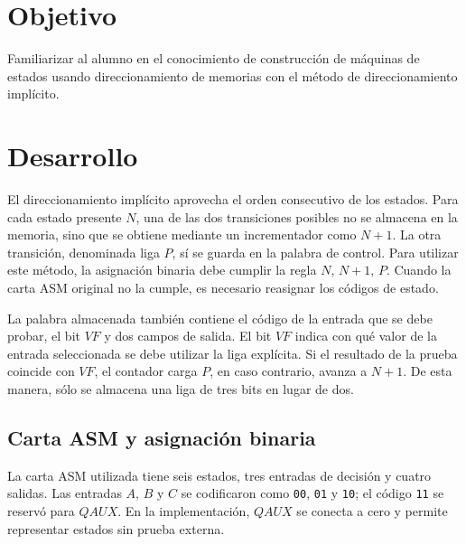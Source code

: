 \documentclass[letterpaper,12pt]{article}
\begin{document}

\newpage

\section{Objetivo}

Familiarizar al alumno en el conocimiento de construcción de máquinas de estados usando direccionamiento de memorias con el método de direccionamiento implícito.

\section{Desarrollo}

El direccionamiento implícito aprovecha el orden consecutivo de los estados. Para cada estado presente $N$, una de las dos transiciones posibles no se almacena en la memoria, sino que se obtiene mediante un incrementador como $N+1$. La otra transición, denominada liga $P$, sí se guarda en la palabra de control. Para utilizar este método, la asignación binaria debe cumplir la regla $N$, $N+1$, $P$. Cuando la carta ASM original no la cumple, es necesario reasignar los códigos de estado.

La palabra almacenada también contiene el código de la entrada que se debe probar, el bit $VF$ y dos campos de salida. El bit $VF$ indica con qué valor de la entrada seleccionada se debe utilizar la liga explícita. Si el resultado de la prueba coincide con $VF$, el contador carga $P$, en caso contrario, avanza a $N+1$. De esta manera, sólo se almacena una liga de tres bits en lugar de dos.

\subsection{Carta ASM y asignación binaria}

La carta ASM utilizada tiene seis estados, tres entradas de decisión y cuatro salidas. Las entradas $A$, $B$ y $C$ se codificaron como \texttt{00}, \texttt{01} y \texttt{10}; el código \texttt{11} se reservó para $QAUX$. En la implementación, $QAUX$ se conecta a cero y permite representar estados sin prueba externa.
\end{document}
